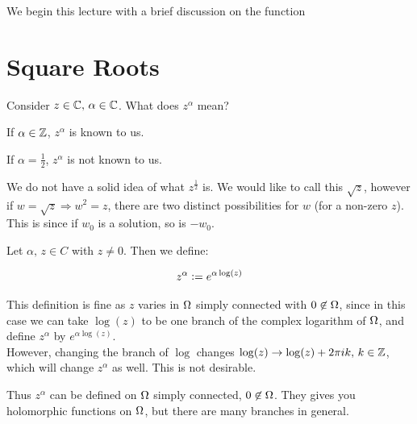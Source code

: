 \setcounter{section}{0}
\setcounter{theorem}{0}


We begin this lecture with a brief discussion on the function

\section{Square Roots}

Consider $z \in \mathbb{C}, \, \alpha \in \mathbb{C}$. What does $z^\alpha$ mean?

\begin{example}

If $\alpha \in \mathbb{Z}$, $z^\alpha$ is known to us.

\end{example}

\begin{example}
If $\alpha = \frac{1}{2}$, $z^\alpha$ is not known to us.
\end{example}

 We do not have a solid idea of what $z^\frac{1}{2}$ is. We would like to call this $\sqrt{z}$, however if $w = \sqrt{z} \Rightarrow w^2 = z$, there are two distinct possibilities for $w$ (for a non-zero $z$). This is since if $w_0$ is a solution, so is $-w_0$.
 
 \begin{definition}[Powers of $z$]
 Let $\alpha,\,z \in C$ with $z \neq 0$. Then we define:
 
 \begin{align*}
     z^\alpha \vcentcolon = e^{\alpha \log(z)}
 \end{align*}
 \end{definition}
 
 
 \begin{remark}
 This definition is fine as $z$ varies in $\Omega$ simply connected with $0 \not\in \Omega$, since in this case we can take $\log(z)$ to be one branch of the complex logarithm of $\Omega$, and define $z^\alpha$ by $e^{\alpha \log(z)}$.\\
 
 However, changing the branch of $\log$ changes $\log(z) \to \log(z) + 2 \pi i k, \, k \in \mathbb{Z}$, which will change $z^\alpha$ as well. This is not desirable.
 \end{remark}
 
 
 Thus $z^ \alpha$ can be defined on $\Omega$ simply connected, $0 \not\in \Omega$. They gives you holomorphic functions on $\Omega$, but there are many branches in general.
 
